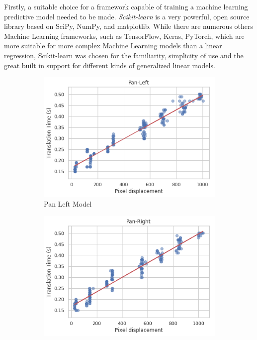 \documentclass{l4proj}
\begin{document}
Firstly, a suitable choice for a framework capable of training a machine learning predictive model needed to be made. \textit{Scikit-learn} is a very powerful, open source library based on SciPy, NumPy, and matplotlib. While there are numerous others Machine Learning frameworks, such as TensorFlow, Keras, PyTorch, which are more suitable for more complex Machine Learning models than a linear regression, Scikit-learn was chosen for the familiarity, simplicity of use and the great built in support for different kinds of generalized linear models.

\begin{figure}[H]
  \begin{subfigure}[b]{0.5\textwidth}
    \includegraphics[width=\textwidth]{l4template-master/images/pan_left.png}
    \caption{Pan Left Model}
    \label{panleftmodel}
  \end{subfigure}
  \begin{subfigure}[b]{0.5\textwidth}
    \includegraphics[width=\textwidth]{l4template-master/images/pan_right.png}

\end{subfigure}
\end{figure}
\end{document}
